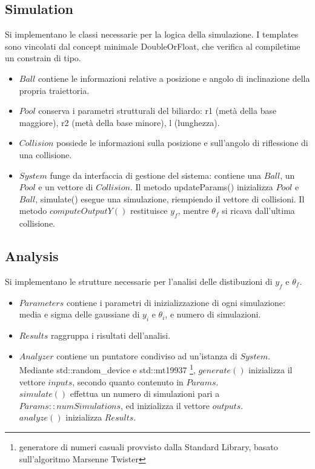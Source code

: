 \documentclass{article}
\begin{document}
\subsection{Simulation}
Si implementano le classi necessarie per la logica della simulazione.
I templates sono vincolati dal concept minimale DoubleOrFloat, che verifica al compiletime un constrain di tipo.
\begin{itemize}
    \item $Ball$ contiene le informazioni relative a posizione e angolo di inclinazione della propria traiettoria.
    \item $Pool$ conserva i parametri strutturali del biliardo: r1 (metà della base maggiore), r2 (metà della base minore),
    l (lunghezza).
    \item $Collision$ possiede le informazioni sulla posizione e sull'angolo di riflessione di una collisione.
    \item $System$ funge da interfaccia di gestione del sistema: contiene una $Ball$, un $Pool$ e un vettore di $Collision$.
    Il metodo updateParams() inizializza $Pool$ e $Ball$, simulate() esegue una simulazione, riempiendo il vettore di collisioni.
    Il metodo $computeOutputY()$ restituisce $y_f$, mentre $\theta_f$ si ricava dall'ultima collisione.

\end{itemize}

\subsection{Analysis}

Si implementano le strutture necessarie per l'analisi delle distibuzioni di $y_f$ e $\theta_f$.
\begin{itemize}
    \item $Parameters$ contiene i parametri di inizializzazione di ogni simulazione: media e sigma delle gaussiane di $y_i$ e $\theta_i$, e numero di simulazioni.
    \item $Results$ raggruppa i risultati dell'analisi.
    \item $Analyzer$ contiene un puntatore condiviso ad un'istanza di $System$. \\
    Mediante std::random\_device e std::mt19937 \footnote{generatore di numeri casuali provvisto dalla Standard Library, basato sull'algoritmo Marsenne Twister}, $generate()$ inizializza il vettore $inputs$, secondo quanto contenuto in $Params$.\\
    $simulate()$ effettua un numero di simulazioni pari a $Params::numSimulations$, ed inizializza il vettore $outputs$.\\
    $analyze()$ inizializza $Results$.
    
\end{itemize}
\end{document}

